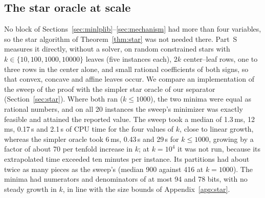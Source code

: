 \subsection{The star oracle at scale}\label{sec:star-bench}

No block of Sections~\ref{sec:minlplib}--\ref{sec:mechanism} had more than
four variables, so the star algorithm of Theorem~\ref{thm:star} was not needed
there. Part~S measures it directly, without a solver, on random constrained
stars with $k\in\{10,100,1000,10000\}$ leaves (five instances each), $2k$
center--leaf rows, one to three rows in the center alone, and small rational
coefficients of both signs, so that convex, concave and affine leaves occur.
We compare an implementation of the sweep of the proof with the simpler star
oracle of our separator (Section~\ref{sec:star}). Where both ran ($k\le1000$),
the two minima were equal as rational numbers, and on all 20 instances the
sweep's minimizer was exactly feasible and attained the reported value. The
sweep took a median of 1.3\,ms, 12\,ms, 0.17\,s and 2.1\,s of CPU time for the
four values of $k$, close to linear growth, whereas the simpler oracle took
6\,ms, 0.43\,s and 29\,s for $k\le1000$, growing by a factor of about 70 per
tenfold increase in $k$; at $k=10^4$ it was not run, because its extrapolated
time exceeded ten minutes per instance. Its partitions had about twice as
many pieces as the sweep's (median 900 against 416 at $k=1000$). The minima
had numerators and denominators of at most 94 and 78 bits, with no steady
growth in $k$, in line with the size bounds of Appendix~\ref{app:star}.
